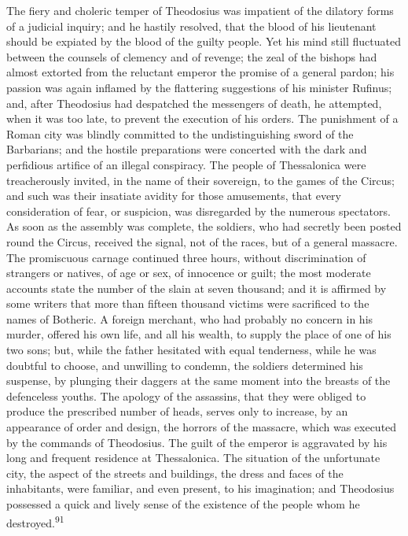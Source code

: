 The fiery and choleric temper of Theodosius was impatient of the
dilatory forms of a judicial inquiry; and he hastily resolved,
that the blood of his lieutenant should be expiated by the blood
of the guilty people. Yet his mind still fluctuated between the
counsels of clemency and of revenge; the zeal of the bishops had
almost extorted from the reluctant emperor the promise of a
general pardon; his passion was again inflamed by the flattering
suggestions of his minister Rufinus; and, after Theodosius had
despatched the messengers of death, he attempted, when it was too
late, to prevent the execution of his orders. The punishment of a
Roman city was blindly committed to the undistinguishing sword of
the Barbarians; and the hostile preparations were concerted with
the dark and perfidious artifice of an illegal conspiracy. The
people of Thessalonica were treacherously invited, in the name of
their sovereign, to the games of the Circus; and such was their
insatiate avidity for those amusements, that every consideration
of fear, or suspicion, was disregarded by the numerous
spectators. As soon as the assembly was complete, the soldiers,
who had secretly been posted round the Circus, received the
signal, not of the races, but of a general massacre. The
promiscuous carnage continued three hours, without discrimination
of strangers or natives, of age or sex, of innocence or guilt;
the most moderate accounts state the number of the slain at seven
thousand; and it is affirmed by some writers that more than
fifteen thousand victims were sacrificed to the names of
Botheric. A foreign merchant, who had probably no concern in his
murder, offered his own life, and all his wealth, to supply the
place of one of his two sons; but, while the father hesitated
with equal tenderness, while he was doubtful to choose, and
unwilling to condemn, the soldiers determined his suspense, by
plunging their daggers at the same moment into the breasts of the
defenceless youths. The apology of the assassins, that they were
obliged to produce the prescribed number of heads, serves only to
increase, by an appearance of order and design, the horrors of
the massacre, which was executed by the commands of Theodosius.
The guilt of the emperor is aggravated by his long and frequent
residence at Thessalonica. The situation of the unfortunate city,
the aspect of the streets and buildings, the dress and faces of
the inhabitants, were familiar, and even present, to his
imagination; and Theodosius possessed a quick and lively sense of
the existence of the people whom he destroyed.\textsuperscript{91}

